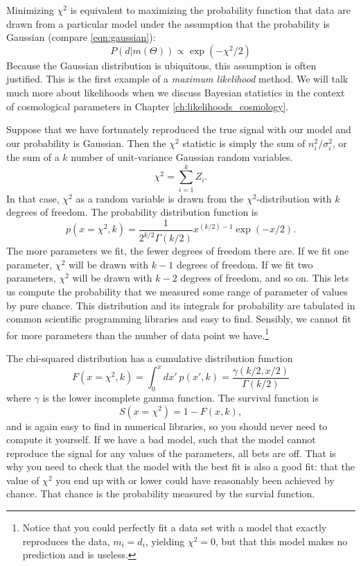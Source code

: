 Minimizing $\chi^2$ is equivalent to maximizing the probability function that data are drawn from a particular model under the assumption that the probability is Gaussian (compare \ref{eqn:gaussian}):
\begin{equation}
  P( d | m(\Theta) ) \propto \exp(-\chi^2/2)
\end{equation}
Because the Gaussian distribution is ubiquitous, this assumption is often justified.  This is the first example of a \textit{maximum likelihood} method.  We will talk much more about likelihoods when we discuss Bayesian statistics in the context of cosmological parameters in Chapter \ref{ch:likelihoods_cosmology}.

Suppose that we have fortunately reproduced the true signal with our model and our probability is Gaussian.  Then the $\chi^2$ statistic is simply the sum of $n_i^2/\sigma_i^2$, or the sum of a $k$ number of unit-variance Gaussian random variables.
\begin{equation}
  \chi^2 = \sum_{i=1}^k Z_i.  \label{eqn:sum_of_gaussians}
\end{equation}
In that case, $\chi^2$ as a random variable is drawn from the $\chi^2$-distribution with $k$ degrees of freedom.  The probability distribution function is 
\begin{equation}
  p(x = \chi^2, k) = \frac{1}{2^{k/2} \Gamma(k/2)} x^{(k/2)-1}\exp(-x/2).
\end{equation}
The more parameters we fit, the fewer degrees of freedom there are.  If we fit one parameter, $\chi^2$ will be drawn with $k-1$ degrees of freedom.  If we fit two parameters,  $\chi^2$ will be drawn with $k-2$ degrees of freedom, and so on.
This lets us compute the probability that we measured some range of parameter of values by pure chance.  This distribution and its integrals for probability are tabulated in common scientific programming libraries and easy to find.  Sensibly, we cannot fit for more parameters than the number of data point we have.\footnote{Notice that you could perfectly fit a data set with a model that exactly reproduces the data, $m_i = d_i$, yielding $\chi^2 = 0$, but that this model makes no prediction and is useless.}

The chi-squared distribution has a cumulative distribution function
\begin{equation}
  F(x = \chi^2,k) = \int_0^x dx'\ p(x',k) = \frac{\gamma(k/2, x/2)}{\Gamma(k/2)}
\end{equation}
where $\gamma$ is the lower incomplete gamma function.  The survival function is
\begin{equation}
  S(x=\chi^2) = 1 - F(x,k),
\end{equation}
and is again easy to find in numerical libraries, so you should never need to compute it yourself.
If we have a bad model, such that the model cannot reproduce the signal for any values of the parameters, all bets are off.  That is why you need to check that the model with the best fit is also a good fit: that the value of $\chi^2$ you end up with or lower could have reasonably been achieved by chance.  That chance is the probability measured by the survial function.

